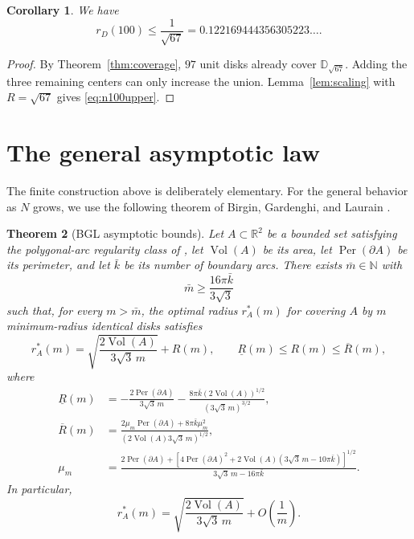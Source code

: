 \documentclass[11pt]{article}
\newtheorem{theorem}{Theorem}[section]
\newtheorem{corollary}[theorem]{Corollary}
\theoremstyle{definition}
\newcommand{\R}{\mathbb{R}}
\newcommand{\D}{\mathbb{D}}
\newcommand{\vol}{\operatorname{Vol}}
\newcommand{\per}{\operatorname{Per}}
\begin{document}
\begin{corollary}
\label{cor:n100}
We have
\begin{equation}
  r_D(100)\le \frac1{\sqrt{67}}
  =
  0.122169444356305223\ldots .
  \label{eq:n100upper}
\end{equation}
\end{corollary}

\begin{proof}
By Theorem~\ref{thm:coverage}, $97$ unit disks already cover
$\D_{\sqrt{67}}$.  Adding the three remaining centers can only increase
the union.  Lemma~\ref{lem:scaling} with $R=\sqrt{67}$ gives
\eqref{eq:n100upper}.
\end{proof}

\section{The general asymptotic law}
\label{sec:asymptotic}

The finite construction above is deliberately elementary.  For the
general behavior as $N$ grows, we use the following theorem of Birgin,
Gardenghi, and Laurain \cite{BirginGardenghiLaurain2024}.

\begin{theorem}[BGL asymptotic bounds]
\label{thm:bgl}
Let $A\subset\R^2$ be a bounded set satisfying the polygonal-arc
regularity class of \cite{BirginGardenghiLaurain2024}, let
$\vol(A)$ be its area, let $\per(\partial A)$ be its perimeter, and let
$\bar k$ be its number of boundary arcs.  There exists
$\bar m\in\mathbb N$ with
\[
  \bar m\ge \frac{16\pi\bar k}{3\sqrt3}
\]
such that, for every $m>\bar m$, the optimal radius $r_A^*(m)$ for
covering $A$ by $m$ minimum-radius identical disks satisfies
\begin{equation}
  r_A^*(m)
  =
  \sqrt{\frac{2\vol(A)}{3\sqrt3\,m}}
  +
  R(m),
  \qquad
  \underline R(m)\le R(m)\le \overline R(m),
  \label{eq:bgldecomp}
\end{equation}
where
\begin{align}
  \underline R(m)
  &=
  -\frac{2\per(\partial A)}{3\sqrt3\,m}
  -\frac{8\pi\bar k(2\vol(A))^{1/2}}{(3\sqrt3\,m)^{3/2}},
  \label{eq:bglower}\\
  \overline R(m)
  &=
  \frac{2\mu_m\per(\partial A)+8\pi\bar k\mu_m^2}
       {(2\vol(A)3\sqrt3\,m)^{1/2}},
  \label{eq:bgupper}\\
  \mu_m
  &=
  \frac{
    2\per(\partial A)
    +\left[
      4\per(\partial A)^2
      +2\vol(A)(3\sqrt3\,m-10\pi\bar k)
    \right]^{1/2}
  }{
    3\sqrt3\,m-16\pi\bar k
  }.
  \label{eq:mu}
\end{align}
In particular,
\begin{equation}
  r_A^*(m)
  =
  \sqrt{\frac{2\vol(A)}{3\sqrt3\,m}}
  +O\!\left(\frac1m\right).
  \label{eq:bgllaw}
\end{equation}
\end{theorem}
\end{document}
